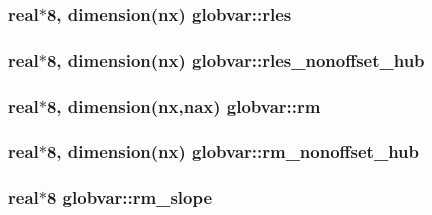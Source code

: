 \subsubsection[{rles}]{\setlength{\rightskip}{0pt plus 5cm}real$\ast$8, dimension({\bf nx}) globvar\+::rles}\label{namespaceglobvar_a94cb0237ff6d0453b0beb753150747e5}
\hypertarget{namespaceglobvar_a3a4e993f098764c396ac8df346106120}{}
\subsubsection[{rles\+\_\+nonoffset\+\_\+hub}]{\setlength{\rightskip}{0pt plus 5cm}real$\ast$8, dimension({\bf nx}) globvar\+::rles\+\_\+nonoffset\+\_\+hub}\label{namespaceglobvar_a3a4e993f098764c396ac8df346106120}
\hypertarget{namespaceglobvar_abafcefbd5ca40029995e377b3763583a}{}
\subsubsection[{rm}]{\setlength{\rightskip}{0pt plus 5cm}real$\ast$8, dimension({\bf nx},{\bf nax}) globvar\+::rm}\label{namespaceglobvar_abafcefbd5ca40029995e377b3763583a}
\hypertarget{namespaceglobvar_a95b82ec95a1e3b3f2b9bbd53364a6fdc}{}
\subsubsection[{rm\+\_\+nonoffset\+\_\+hub}]{\setlength{\rightskip}{0pt plus 5cm}real$\ast$8, dimension({\bf nx}) globvar\+::rm\+\_\+nonoffset\+\_\+hub}\label{namespaceglobvar_a95b82ec95a1e3b3f2b9bbd53364a6fdc}
\hypertarget{namespaceglobvar_a7c5baea908b3455982aa5e0919c52887}{}
\subsubsection[{rm\+\_\+slope}]{\setlength{\rightskip}{0pt plus 5cm}real$\ast$8 globvar\+::rm\+\_\+slope}\label{namespaceglobvar_a7c5baea908b3455982aa5e0919c52887}
\hypertarget{namespaceglobvar_ab216d846edeea68aa1a53f31d84b33c0}{}
